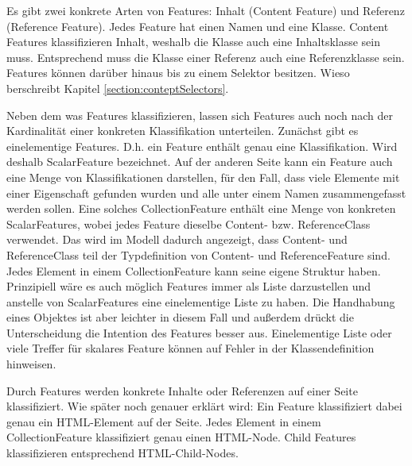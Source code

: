 
        Es gibt zwei konkrete Arten von Features: Inhalt (Content Feature) und Referenz (Reference Feature).
        Jedes Feature hat einen Namen und eine Klasse.
        Content Features klassifizieren Inhalt, weshalb die Klasse auch eine Inhaltsklasse sein muss.
        Entsprechend muss die Klasse einer Referenz auch eine Referenzklasse sein.
        Features können darüber hinaus bis zu einem Selektor besitzen.
        Wieso berschreibt Kapitel \ref{section:conteptSelectors}.
    
        Neben dem was Features klassifizieren, lassen sich Features auch noch nach der
        Kardinalität einer konkreten Klassifikation unterteilen.
        Zunächst gibt es einelementige Features.
        D.h. ein Feature enthält genau eine Klassifikation.
        Wird deshalb ScalarFeature bezeichnet.
        Auf der anderen Seite kann ein Feature auch eine Menge von Klassifikationen
        darstellen, für den Fall, dass viele Elemente mit einer Eigenschaft gefunden wurden
        und alle unter einem Namen zusammengefasst werden sollen.
        Eine solches CollectionFeature enthält eine Menge von konkreten ScalarFeatures,
        wobei jedes Feature dieselbe Content- bzw. ReferenceClass verwendet.
        Das wird im Modell dadurch angezeigt, dass Content- und ReferenceClass teil der Typdefinition
        von Content- und ReferenceFeature sind.
        Jedes Element in einem CollectionFeature kann seine eigene Struktur haben.
        Prinzipiell wäre es auch möglich Features immer als Liste darzustellen
        und anstelle von ScalarFeatures eine einelementige Liste zu haben.
        Die Handhabung eines Objektes ist aber leichter in diesem Fall und außerdem drückt
        die Unterscheidung die Intention des Features besser aus.
        Einelementige Liste oder viele Treffer für skalares Feature können auf Fehler in der
        Klassendefinition hinweisen.

        Durch Features werden konkrete Inhalte oder Referenzen auf einer Seite klassifiziert.
        Wie später noch genauer erklärt wird:
        Ein Feature klassifiziert dabei genau ein HTML-Element auf der Seite.
        Jedes Element in einem CollectionFeature klassifiziert genau einen HTML-Node.
        Child Features klassifizieren entsprechend HTML-Child-Nodes.

